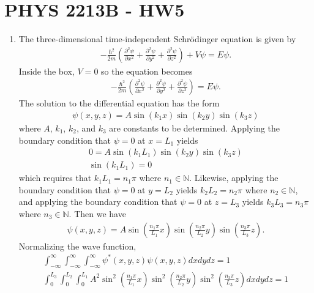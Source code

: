 \documentclass[a4paper,12pt]{article}
\begin{document}
\section*{PHYS 2213B - HW5}

\begin{enumerate}
    \item
        The three-dimensional time-independent Schr\"odinger equation is given by
        \begin{align*}
            -\frac{\hbar^2}{2m} \left( \frac{\partial^2 \psi}{\partial x^2} + \frac{\partial^2 \psi}{\partial y^2} + \frac{\partial^2 \psi}{\partial z^2} \right) + V \psi = E \psi.
        \end{align*}
        Inside the box, $V = 0$ so the equation becomes
        \begin{align}
            -\frac{\hbar^2}{2m} \left( \frac{\partial^2 \psi}{\partial x^2} + \frac{\partial^2 \psi}{\partial y^2} + \frac{\partial^2 \psi}{\partial z^2} \right) = E \psi.
        \end{align}
        The solution to the differential equation has the form
        \begin{align*}
            \psi(x, y, z) = A \sin(k_1 x) \sin(k_2 y) \sin(k_3 z)
        \end{align*}
        where $A$, $k_1$, $k_2$, and $k_3$ are constants to be determined. Applying the boundary condition that $\psi = 0$ at $x = L_1$ yields
        \begin{gather*}
            0 = A \sin(k_1 L_1) \sin(k_2 y) \sin(k_3 z) \\
            \sin(k_1 L_1) = 0
        \end{gather*}
        which requires that $k_1 L_1 = n_1 \pi$ where $n_1 \in \mathbb{N}$. Likewise, applying the boundary condition that $\psi = 0$ at $y = L_2$ yields $k_2 L_2 = n_2 \pi$ where $n_2 \in \mathbb{N}$, and applying the boundary condition that $\psi = 0$ at $z = L_3$ yields $k_3 L_3 = n_3 \pi$ where $n_3 \in \mathbb{N}$. Then we have
        \begin{align}
            \psi(x, y, z) = A \sin(\frac{n_1 \pi}{L_1} x) \sin(\frac{n_2 \pi}{L_2} y) \sin(\frac{n_3 \pi}{L_3} z).
        \end{align}
        Normalizing the wave function,
        \begin{gather*}
            \int_{-\infty}^\infty \int_{-\infty}^\infty \int_{-\infty}^\infty \psi^*(x, y, z) \psi(x, y, z) dx dy dz = 1 \\
            \int_0^{L_3} \int_0^{L_2} \int_0^{L_1} A^2 \sin^2 \left( \frac{n_1 \pi}{L_1} x \right) \sin^2 \left( \frac{n_2 \pi}{L_2} y \right) \sin^2 \left( \frac{n_3 \pi}{L_3} z \right) dx dy dz = 1 \\

\end{gather*}
\end{enumerate}
\end{document}
